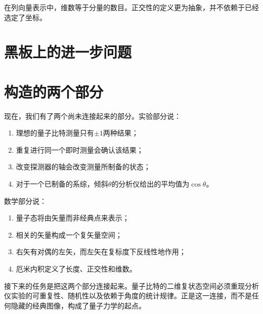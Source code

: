 \begin{classroomqa}
\end{classroomqa}

\begin{remark}
在列向量表示中，维数等于分量的数目。正交性的定义更为抽象，并不依赖于已经选定了坐标。
\end{remark}

\section{黑板上的进一步问题}

\begin{classroomqa}
\end{classroomqa}

\begin{classroomqa}
\end{classroomqa}

\begin{classroomqa}
\end{classroomqa}

\section{构造的两个部分}

现在，我们有了两个尚未连接起来的部分。实验部分说：
\begin{enumerate}
  \item 理想的量子比特测量只有\(\pm1\)两种结果；
  \item 重复进行同一个即时测量会确认该结果；
  \item 改变探测器的轴会改变测量所制备的状态；
  \item 对于一个已制备的系综，倾斜\(\theta\)的分析仪给出的平均值为\(\cos\theta\)。
\end{enumerate}
数学部分说：
\begin{enumerate}
  \item 量子态将由矢量而非经典点来表示；
  \item 相关的矢量构成一个复矢量空间；
  \item 右矢有对偶的左矢，而左矢在复标度下反线性地作用；
  \item 厄米内积定义了长度、正交性和维数。
\end{enumerate}

接下来的任务是把这两个部分连接起来。量子比特的二维复状态空间必须重现分析仪实验的可重复性、随机性以及依赖于角度的统计规律。正是这一连接，而不是任何隐藏的经典图像，构成了量子力学的起点。
